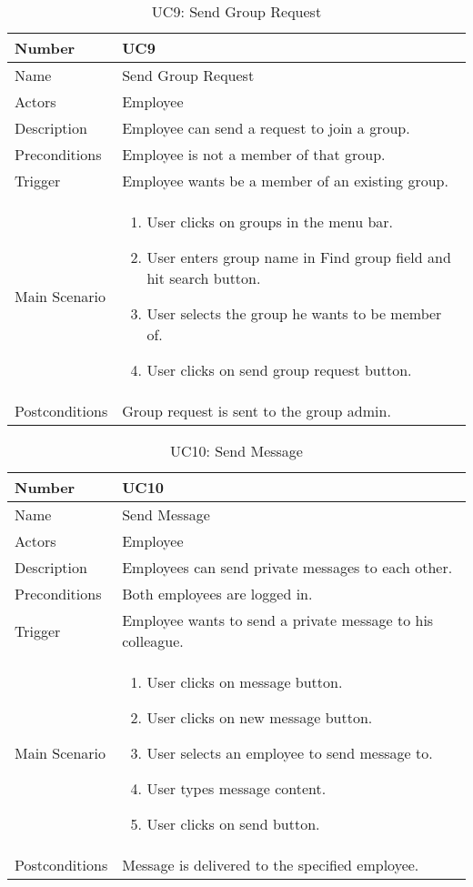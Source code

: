 \documentclass[12pt,a4paper]{article}
\begin{document}
\begin{table}[h]
\centering
\caption{UC9: Send Group Request}
\label{tab:uc9}
\begin{tabularx}{\textwidth}{@{}lX@{}}
\toprule

Number & UC9 \\ \midrule
Name & Send Group Request \\
Actors & Employee\\
Description & Employee can send a request to join a group.
 \\
Preconditions & 
Employee is not a member of that group.
 \\
 
Trigger & Employee wants be a member of an existing group.\\
Main Scenario & 
\begin{enumerate}
\item User clicks on groups in the menu bar.
\item User enters group name in Find group field and hit search button.
\item User selects the group he wants to be member of.
\item User clicks on send group request button.  
\end{enumerate}
 \\
Postconditions & Group request is sent to the group admin. \\
\bottomrule
\end{tabularx}
\end{table}

\begin{table}[h]
\centering
\caption{UC10: Send Message}
\label{tab:uc10}
\begin{tabularx}{\textwidth}{@{}lX@{}}
\toprule

Number & UC10 \\ \midrule
Name & Send Message \\
Actors & Employee\\
Description & Employees can send private messages to each other.
 \\
Preconditions & 
Both employees are logged in.
 \\
 
Trigger & Employee wants to send a private message to his colleague.\\

Main Scenario & 
\begin{enumerate}
\item User clicks on message button.
\item User clicks on new message button.
\item User selects an employee to send message to.
\item User types message content.
\item User clicks on send button. 
\end{enumerate}
 \\
Postconditions & Message is delivered to the specified employee. \\
\bottomrule
\end{tabularx}
\end{table}
\end{document}
